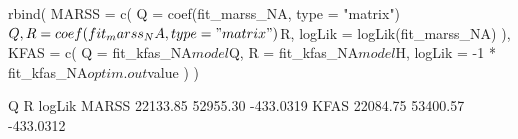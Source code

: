 \begin{Schunk}
\begin{Sinput}
 rbind(
   MARSS = c(
     Q = coef(fit_marss_NA, type = "matrix")$Q,
     R = coef(fit_marss_NA, type = "matrix")$R,
     logLik = logLik(fit_marss_NA)
   ),
   KFAS = c(
     Q = fit_kfas_NA$model$Q,
     R = fit_kfas_NA$model$H,
     logLik = -1 * fit_kfas_NA$optim.out$value
   )
 )
\end{Sinput}
\begin{Soutput}
             Q        R    logLik
MARSS 22133.85 52955.30 -433.0319
KFAS  22084.75 53400.57 -433.0312
\end{Soutput}
\end{Schunk}
